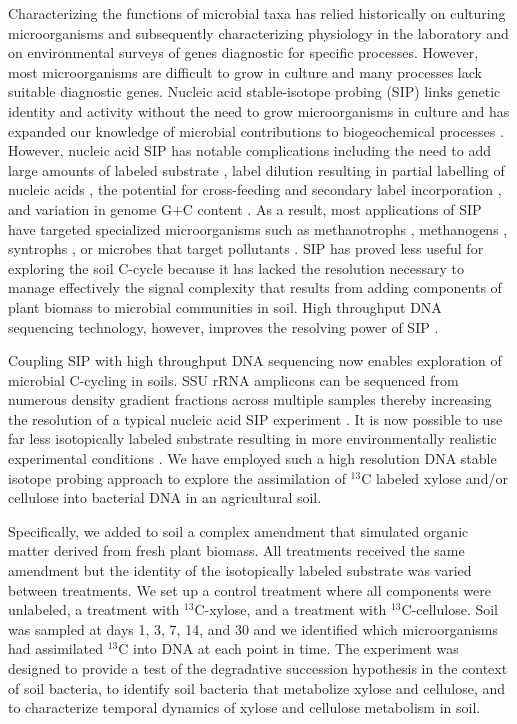 Characterizing the functions of microbial taxa has relied historically on
culturing microorganisms and subsequently characterizing physiology in the
laboratory and on environmental surveys of genes diagnostic for specific
processes. However, most microorganisms are difficult to grow in
culture \citep{Janssen2006} and many processes lack suitable diagnostic genes.
Nucleic acid stable-isotope probing (SIP) links genetic identity and activity
without the need to grow microorganisms in culture and has expanded our
knowledge of microbial contributions to biogeochemical processes
\citep{Chen_Murrell_2010}. However, nucleic acid SIP has notable complications
including the need to add large amounts of labeled substrate
\citep{radajewski2000stable}, label dilution resulting in partial labelling of
nucleic acids \citep{radajewski2000stable,Manefield_2002,McDonald_2005}, the
potential for cross-feeding and secondary label incorporation
\citep{Morris_2002,Hutchens2004,14686943,DeRito2005,McDonald_2005,Ziegler_2005},
and variation in genome G$+$C content
\citep{Buckley_2007,9780408708036,Holben1995,Nusslein1999}. As a result, most
applications of SIP have targeted specialized microorganisms such as
methanotrophs \citep{radajewski2000stable}, methanogens \citep{lu2005},
syntrophs \citep{lueders2004}, or microbes that target pollutants
\citep{derito2005}. SIP has proved less useful for exploring the soil C-cycle
because it has lacked the resolution necessary to manage effectively the signal
complexity that results from adding components of plant biomass to microbial
communities in soil. High throughput DNA sequencing technology, however,
improves the resolving power of SIP \citep{Aoyagi2015}. 

Coupling SIP with high throughput DNA sequencing now enables exploration of
microbial C-cycling in soils. SSU rRNA amplicons can be sequenced
from numerous density gradient fractions across multiple samples thereby
increasing the resolution of a typical nucleic acid SIP experiment
\citep{Verastegui_2014}. It is now possible to use far less isotopically
labeled substrate resulting in more environmentally realistic experimental
conditions \citep{Aoyagi2015}. We have employed such a high resolution DNA
stable isotope probing approach to explore the assimilation of $^{13}$C labeled
xylose and/or cellulose into bacterial DNA in an agricultural soil. 

Specifically, we added to soil a complex amendment that simulated organic
matter derived from fresh plant biomass. All treatments received the same
amendment but the identity of the isotopically labeled substrate was varied
between treatments. We set up a control treatment where all components were
unlabeled, a treatment with $^{13}$C-xylose, and a treatment with
$^{13}$C-cellulose. Soil was sampled at days 1, 3, 7, 14, and 30 and we
identified which microorganisms had assimilated $^{13}$C into DNA at each point
in time. The experiment was designed to provide a test of the
degradative succession hypothesis in the context of soil bacteria, to identify
soil bacteria that metabolize xylose and cellulose, and to characterize
temporal dynamics of xylose and cellulose metabolism in soil. 
